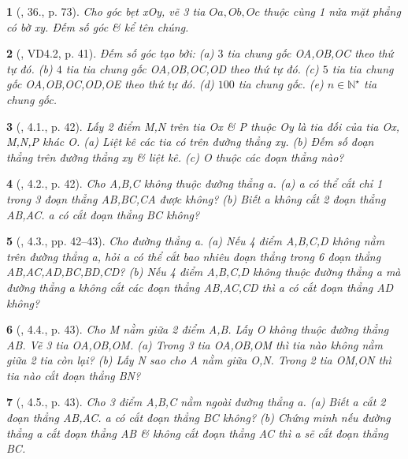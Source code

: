 \documentclass{article}
\newtheorem{baitoan}{}
\begin{document}
\begin{baitoan}[\cite{Binh_Toan_6_tap_2}, 36., p. 73]
	Cho góc bẹt xOy, vẽ 3 tia $Oa,Ob,Oc$ thuộc cùng 1 nửa mặt phẳng có bờ xy. Đếm số góc \& kể tên chúng.
\end{baitoan}

\begin{baitoan}[\cite{TLCT_THCS_Toan_6_hinh_hoc}, VD4.2, p. 41]
	Đếm số góc tạo bởi: (a) $3$ tia chung gốc OA,OB,OC theo thứ tự đó. (b) $4$ tia tia chung gốc OA,OB,OC,OD theo thứ tự đó. (c) $5$ tia tia chung gốc OA,OB,OC,OD,OE theo thứ tự đó. (d) $100$ tia chung gốc. (e) $n\in\mathbb{N}^\star$ tia chung gốc.
\end{baitoan}

\begin{baitoan}[\cite{TLCT_THCS_Toan_6_hinh_hoc}, 4.1., p. 42]
	Lấy 2 điểm M,N trên tia Ox \& P thuộc Oy là tia đối của tia Ox, M,N,P khác O. (a) Liệt kê các tia có trên đường thẳng xy. (b) Đếm số đoạn thẳng trên đường thẳng xy \& liệt kê. (c) O thuộc các đoạn thẳng nào?
\end{baitoan}

\begin{baitoan}[\cite{TLCT_THCS_Toan_6_hinh_hoc}, 4.2., p. 42]
	Cho A,B,C không thuộc đường thẳng a. (a) a có thể cắt chỉ 1 trong 3 đoạn thẳng AB,BC,CA được không? (b) Biết a không cắt 2 đoạn thẳng AB,AC. a có cắt đoạn thẳng BC không?
\end{baitoan}

\begin{baitoan}[\cite{TLCT_THCS_Toan_6_hinh_hoc}, 4.3., pp. 42--43]
	Cho đường thẳng a. (a) Nếu 4 điểm A,B,C,D không nằm trên đường thẳng a, hỏi a có thể cắt bao nhiêu đoạn thẳng trong 6 đoạn thẳng AB,AC,AD,BC,BD,CD? (b) Nếu 4 điểm A,B,C,D không thuộc đường thẳng a mà đường thẳng a không cắt các đoạn thẳng AB,AC,CD thì a có cắt đoạn thẳng AD không?
\end{baitoan}

\begin{baitoan}[\cite{TLCT_THCS_Toan_6_hinh_hoc}, 4.4., p. 43]
	Cho M nằm giữa 2 điểm A,B. Lấy O không thuộc đường thẳng AB. Vẽ 3 tia OA,OB,OM. (a) Trong 3 tia OA,OB,OM thì tia nào không nằm giữa 2 tia còn lại? (b) Lấy N sao cho A nằm giữa O,N. Trong 2 tia OM,ON thì tia nào cắt đoạn thẳng BN?
\end{baitoan}

\begin{baitoan}[\cite{TLCT_THCS_Toan_6_hinh_hoc}, 4.5., p. 43]
	Cho 3 điểm A,B,C nằm ngoài đường thẳng a. (a) Biết a cắt 2 đoạn thẳng AB,AC. a có cắt đoạn thẳng BC không? (b) Chứng minh nếu đường thẳng a cắt đoạn thẳng AB \& không cắt đoạn thẳng AC thì a sẽ cắt đoạn thẳng BC.
\end{baitoan}
\end{document}
